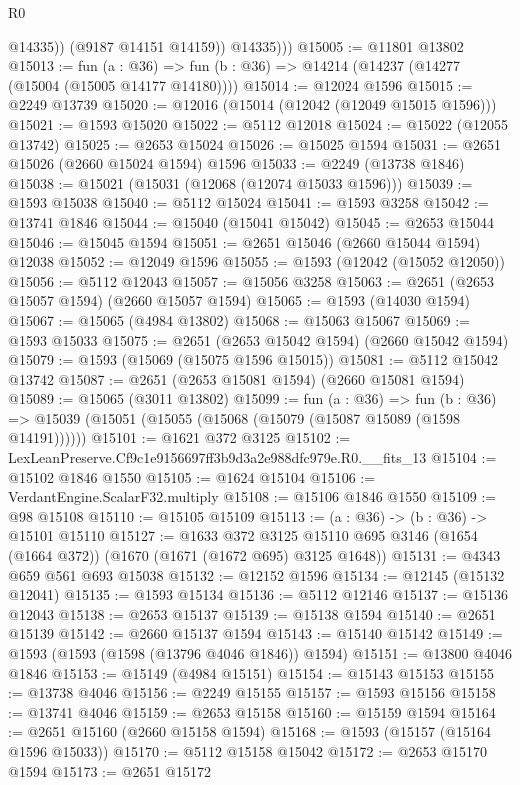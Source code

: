\begin{lexlean}{R0}
\begin{coremodule}
                @14335))
            (@9187 @14151 @14159))
          @14335)))
@15005 := @11801 @13802
@15013 := fun (a : @36) => fun (b : @36) => @14214 (@14237 (@14277 (@15004 (@15005 @14177 @14180))))
@15014 := @12024 @1596
@15015 := @2249 @13739
@15020 := @12016 (@15014 (@12042 (@12049 @15015 @1596)))
@15021 := @1593 @15020
@15022 := @5112 @12018
@15024 := @15022 (@12055 @13742)
@15025 := @2653 @15024
@15026 := @15025 @1594
@15031 := @2651 @15026 (@2660 @15024 @1594) @1596
@15033 := @2249 (@13738 @1846)
@15038 := @15021 (@15031 (@12068 (@12074 @15033 @1596)))
@15039 := @1593 @15038
@15040 := @5112 @15024
@15041 := @1593 @3258
@15042 := @13741 @1846
@15044 := @15040 (@15041 @15042)
@15045 := @2653 @15044
@15046 := @15045 @1594
@15051 := @2651 @15046 (@2660 @15044 @1594) @12038
@15052 := @12049 @1596
@15055 := @1593 (@12042 (@15052 @12050))
@15056 := @5112 @12043
@15057 := @15056 @3258
@15063 := @2651 (@2653 @15057 @1594) (@2660 @15057 @1594)
@15065 := @1593 (@14030 @1594)
@15067 := @15065 (@4984 @13802)
@15068 := @15063 @15067
@15069 := @1593 @15033
@15075 := @2651 (@2653 @15042 @1594) (@2660 @15042 @1594)
@15079 := @1593 (@15069 (@15075 @1596 @15015))
@15081 := @5112 @15042 @13742
@15087 := @2651 (@2653 @15081 @1594) (@2660 @15081 @1594)
@15089 := @15065 (@3011 @13802)
@15099 := fun (a : @36) =>
  fun (b : @36) => @15039 (@15051 (@15055 (@15068 (@15079 (@15087 @15089 (@1598 @14191))))))
@15101 := @1621 @372 @3125
@15102 := LexLeanPreserve.Cf9c1e9156697ff3b9d3a2e988dfc979e.R0.__fits_13
@15104 := @15102 @1846 @1550
@15105 := @1624 @15104
@15106 := VerdantEngine.ScalarF32.multiply
@15108 := @15106 @1846 @1550
@15109 := @98 @15108
@15110 := @15105 @15109
@15113 := (a : @36) -> (b : @36) -> @15101 @15110
@15127 := @1633
    @372
    @3125
    @15110
    @695
    @3146
    (@1654 (@1664 @372))
    (@1670 (@1671 (@1672 @695) @3125 @1648))
@15131 := @4343 @659 @561 @693 @15038
@15132 := @12152 @1596
@15134 := @12145 (@15132 @12041)
@15135 := @1593 @15134
@15136 := @5112 @12146
@15137 := @15136 @12043
@15138 := @2653 @15137
@15139 := @15138 @1594
@15140 := @2651 @15139
@15142 := @2660 @15137 @1594
@15143 := @15140 @15142
@15149 := @1593 (@1593 (@1598 (@13796 @4046 @1846)) @1594)
@15151 := @13800 @4046 @1846
@15153 := @15149 (@4984 @15151)
@15154 := @15143 @15153
@15155 := @13738 @4046
@15156 := @2249 @15155
@15157 := @1593 @15156
@15158 := @13741 @4046
@15159 := @2653 @15158
@15160 := @15159 @1594
@15164 := @2651 @15160 (@2660 @15158 @1594)
@15168 := @1593 (@15157 (@15164 @1596 @15033))
@15170 := @5112 @15158 @15042
@15172 := @2653 @15170 @1594
@15173 := @2651 @15172

\end{coremodule}
\end{lexlean}
